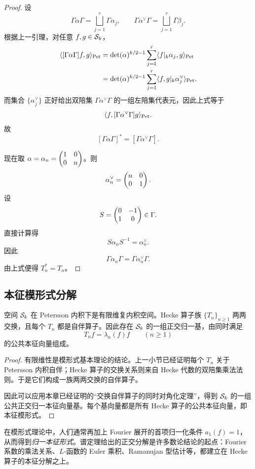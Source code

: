 \begin{proof}
设
\[
\Gamma\alpha\Gamma=\bigsqcup_{j=1}^r \Gamma\alpha_j,
\qquad
\Gamma\alpha^{\vee}\Gamma=\bigsqcup_{j=1}^r \Gamma\beta_j.
\]
根据上一引理，对任意 $f,g\in \mathcal{S}_k$，
\begin{align*}
\langle [\Gamma\alpha\Gamma]f, g \rangle_{\mathrm{Pet}}
&=\det(\alpha)^{k/2-1}\sum_{j=1}^r \langle f|_k\alpha_j, g \rangle_{\mathrm{Pet}}\\
&=\det(\alpha)^{k/2-1}\sum_{j=1}^r \langle f, g|_k\alpha_j^{\vee} \rangle_{\mathrm{Pet}}.
\end{align*}
而集合 $\{\alpha_j^{\vee}\}$ 正好给出双陪集 $\Gamma\alpha^{\vee}\Gamma$ 的一组左陪集代表元，因此上式等于
\[
\langle f, [\Gamma\alpha^{\vee}\Gamma]g \rangle_{\mathrm{Pet}}.
\]
故
\[
[\Gamma\alpha\Gamma]^*=[\Gamma\alpha^{\vee}\Gamma].
\]

现在取 $\alpha=\alpha_n=\begin{pmatrix} 1&0\\0&n \end{pmatrix}$。则
\[
\alpha_n^{\vee}=\begin{pmatrix} n&0\\0&1 \end{pmatrix}.
\]
设
\[
S=\begin{pmatrix} 0&-1\\1&0 \end{pmatrix}\in \Gamma.
\]
直接计算得
\[
S\alpha_nS^{-1}=\alpha_n^{\vee}.
\]
因此
\[
\Gamma\alpha_n\Gamma=\Gamma\alpha_n^{\vee}\Gamma.
\]
由上式便得 $T_n^*=T_n$。
\end{proof}

\subsection{本征模形式分解}

\begin{theorem}
空间 $\mathcal{S}_k$ 在 Petersson 内积下是有限维复内积空间。Hecke 算子族 $\{T_n\}_{n\ge 1}$ 两两交换，且每个 $T_n$ 都是自伴算子。因此存在 $\mathcal{S}_k$ 的一组正交归一基，由同时满足
\[
T_nf=\lambda_n(f)f\qquad (n\ge 1)
\]
的公共本征向量组成。
\end{theorem}

\begin{proof}
有限维性是模形式基本理论的结论。上一小节已经证明每个 $T_n$ 关于 Petersson 内积自伴；Hecke 算子的交换关系则来自 Hecke 代数的双陪集乘法法则。于是它们构成一族两两交换的自伴算子。

因此可以应用本章已经证明的“交换自伴算子的同时对角化定理”，得到 $\mathcal{S}_k$ 的一组公共正交归一本征向量基。每个基向量都是所有 Hecke 算子的公共本征向量，即本征模形式。
\end{proof}

\begin{remark}
在模形式理论中，人们通常再加上 Fourier 展开的首项归一化条件 $a_1(f)=1$，从而得到\emph{归一本征形式}。谱定理给出的正交分解是许多数论结论的起点：Fourier 系数的乘法关系、$L$-函数的 Euler 乘积、Ramanujan 型估计等，都建立在 Hecke 算子的本征分解之上。
\end{remark}

